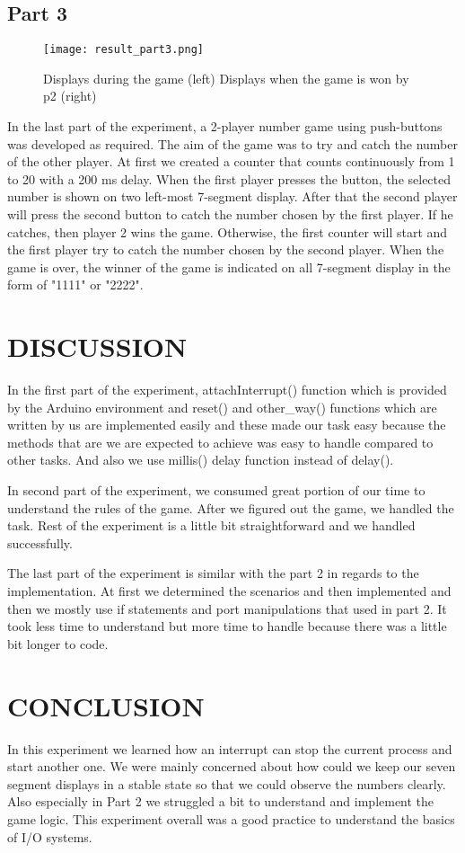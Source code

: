 \documentclass[pdftex,12pt,a4paper]{article}
\begin{document}
\subsection{Part 3}
\begin{figure}[ht]
	\centering
	\texttt{[image: result\_part3.png]}	
	\caption{Displays during the game (left) Displays when the game is won by p2 (right)}
	\label{fig9}
\end{figure}
In the last part of the experiment, a 2-player number game using push-buttons was developed as required. The aim of the game was to try and catch the number of the other player. At first we created a counter that counts continuously from 1 to 20 with a 200 ms delay. When the first player presses the  button, the selected number is shown on two left-most 7-segment display. After that the second player will press the second button to catch the number chosen by the first player. If he catches, then player 2 wins the game. Otherwise, the first counter will start and the first player try to catch the number chosen by the second player. When the game is over, the winner of the game is indicated on all 7-segment display in the form of "1111" or "2222".
\section{DISCUSSION}
In the first part of the experiment, attachInterrupt() function which is provided by the Arduino environment and reset() and other\_way() functions which are written by us are implemented easily and these made our task easy because the methods that are we are expected to achieve was easy to handle compared to other tasks. And also we use millis() delay function instead of delay().

In second part of the experiment, we consumed great portion of our time to understand the rules of the game. After we figured out the game, we handled the task. Rest of the experiment is a little bit straightforward and we handled successfully.

The last part of the experiment is similar with the part 2 in regards to the implementation. At first we determined the scenarios and then implemented and then we mostly use if statements and port manipulations that used in part 2. It took less time to understand but more time to handle because there was a little bit longer to code.
\newpage
\section{CONCLUSION}
In this experiment we learned how an interrupt can stop the current process and start another one.  We were mainly concerned about how could we keep our seven segment displays in a stable state so that we could observe the numbers clearly. Also especially in Part 2 we struggled a bit to understand and implement the game logic. This experiment overall was a good practice to understand the basics of I/O systems.
\end{document}
